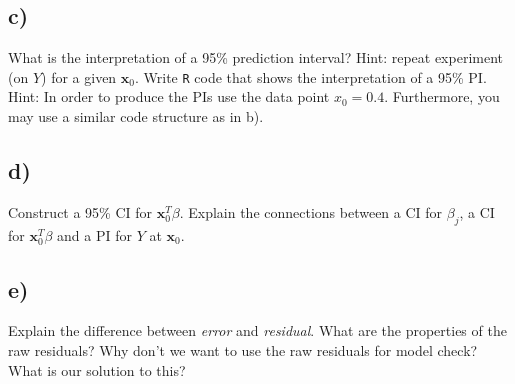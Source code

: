 \documentclass[
]{article}
\begin{document}
\hypertarget{c-1}{%
\subsection{c)}\label{c-1}}

What is the interpretation of a 95\% prediction interval? Hint: repeat
experiment (on \(Y\)) for a given \({\boldsymbol x}_0\). Write
\texttt{R} code that shows the interpretation of a 95\% PI. Hint: In
order to produce the PIs use the data point \(x_0 = 0.4.\) Furthermore,
you may use a similar code structure as in b).

\hypertarget{d-1}{%
\subsection{d)}\label{d-1}}

Construct a 95\% CI for \({\boldsymbol x}_0^T \beta\). Explain the
connections between a CI for \(\beta_j\), a CI for
\({\boldsymbol x}_0^T \beta\) and a PI for \(Y\) at
\({\boldsymbol x}_0\).

\hypertarget{e-1}{%
\subsection{e)}\label{e-1}}

Explain the difference between \emph{error} and \emph{residual}. What
are the properties of the raw residuals? Why don't we want to use the
raw residuals for model check? What is our solution to this?
\end{document}
